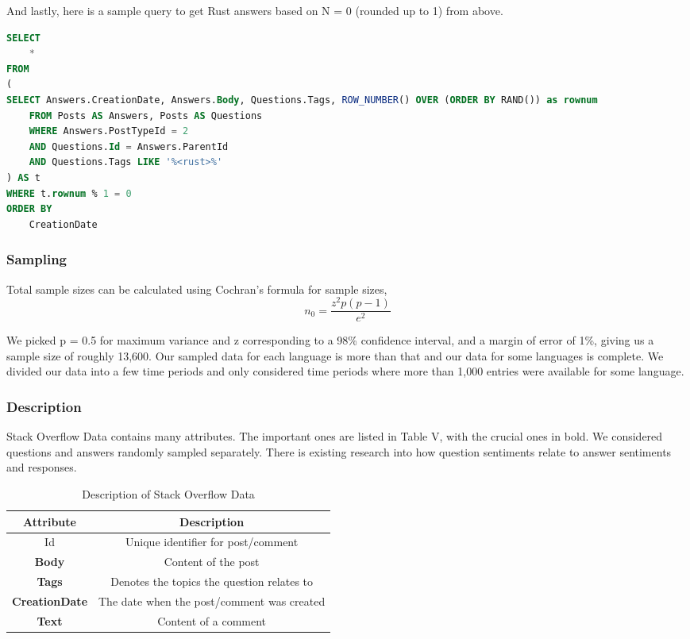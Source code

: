 \documentclass[conference]{IEEEtran}
\begin{document}
And lastly, here is a sample query to get Rust answers based on N = 0 (rounded up to 1) from above.
\begin{lstlisting}[language=SQL]
SELECT
    *
FROM
(
SELECT Answers.CreationDate, Answers.Body, Questions.Tags, ROW_NUMBER() OVER (ORDER BY RAND()) as rownum
    FROM Posts AS Answers, Posts AS Questions
    WHERE Answers.PostTypeId = 2
    AND Questions.Id = Answers.ParentId
    AND Questions.Tags LIKE '%<rust>%'
) AS t
WHERE t.rownum % 1 = 0
ORDER BY
    CreationDate
\end{lstlisting}


\subsubsection{Sampling} Total sample sizes can be calculated using Cochran's formula for sample sizes\cite{b9, b12}, 
\begin{equation}
    n_0 = \frac{z^2p(p-1)}{e^2}
\end{equation}

We picked p = 0.5 for maximum variance and z corresponding to a 98\% confidence interval, and a margin of error of 1\%, giving us a sample size of roughly 13,600. Our sampled data for each language is more than that and our data for some languages is complete. We divided our data into a few time periods and only considered time periods where more than 1,000 entries were available for some language.\\

\subsubsection{Description}
Stack Overflow Data contains many attributes. The important ones are listed in Table V, with the crucial ones in bold. We considered questions and answers randomly sampled separately. There is existing research into how question sentiments relate to answer sentiments and responses\cite{b30, b3}. \\

\begin{table}[htbp]
\caption{Description of Stack Overflow Data}
\begin{center}
\begin{tabular}{|c|c|}
\hline
\textbf{Attribute}&\textbf{Description}\\
\hline
Id&Unique identifier for post/comment\\
\hline
\textbf{Body}&Content of the post\\
\hline
\textbf{Tags}&Denotes the topics the question relates to\\
\hline
\textbf{CreationDate}&The date when the post/comment was created\\
\hline
\textbf{Text}&Content of a comment\\
\hline
\end{tabular}
\label{tab1}
\end{center}
\end{table}
\end{document}
